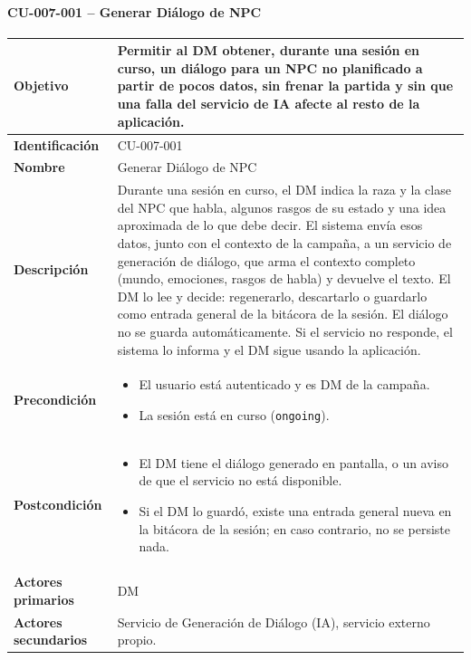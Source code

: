 \paragraph{CU-007-001 -- Generar Diálogo de NPC}
{\small\setlength{\tabcolsep}{5pt}\renewcommand{\arraystretch}{1.2}
\begin{longtable}{|>{\raggedright\arraybackslash\bfseries}p{3.2cm}|>{\raggedright\arraybackslash}p{11.9cm}|}
\hline
Objetivo & Permitir al DM obtener, durante una sesión en curso, un diálogo para un NPC no planificado a partir de pocos datos, sin frenar la partida y sin que una falla del servicio de IA afecte al resto de la aplicación. \\ \hline
Identificación & CU-007-001 \\ \hline
Nombre & Generar Diálogo de NPC \\ \hline
Descripción & Durante una sesión en curso, el DM indica la raza y la clase del NPC que habla, algunos rasgos de su estado y una idea aproximada de lo que debe decir. El sistema envía esos datos, junto con el contexto de la campaña, a un servicio de generación de diálogo, que arma el contexto completo (mundo, emociones, rasgos de habla) y devuelve el texto. El DM lo lee y decide: regenerarlo, descartarlo o guardarlo como entrada general de la bitácora de la sesión. El diálogo no se guarda automáticamente. Si el servicio no responde, el sistema lo informa y el DM sigue usando la aplicación. \\ \hline
Precondición & \begin{itemize}[itemsep=2pt,topsep=2pt]
\item El usuario está autenticado y es DM de la campaña.
\item La sesión está en curso (\texttt{ongoing}).
\end{itemize} \\ \hline
Postcondición & \begin{itemize}[itemsep=2pt,topsep=2pt]
\item El DM tiene el diálogo generado en pantalla, o un aviso de que el servicio no está disponible.
\item Si el DM lo guardó, existe una entrada general nueva en la bitácora de la sesión; en caso contrario, no se persiste nada.
\end{itemize} \\ \hline
Actores primarios & DM \\ \hline
Actores secundarios & Servicio de Generación de Diálogo (IA), servicio externo propio. \\ \hline

\end{longtable}}

